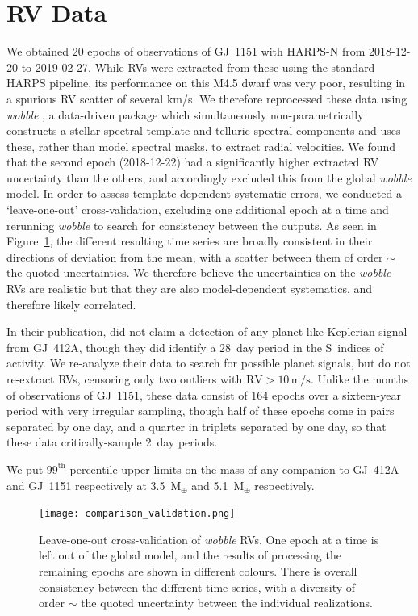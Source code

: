 \documentclass[modern]{aastex62}
\newcommand{\mearth}{\mbox{$\mathrm{M}_{\oplus}$}\xspace}
\begin{document}
\section{RV Data}
\label{sec:k2}

We obtained 20 epochs of observations of GJ~1151 with HARPS-N from 2018-12-20 to 2019-02-27. While RVs were extracted from these using the standard HARPS pipeline, its performance on this M4.5 dwarf was very poor, resulting in a spurious RV scatter of several km/s. We therefore reprocessed these data using \textit{wobble} \citep{wobble}, a data-driven package which simultaneously non-parametrically constructs a stellar spectral template and telluric spectral components and uses these, rather than model spectral masks, to extract radial velocities. We found that the second epoch (2018-12-22) had a significantly higher extracted RV uncertainty than the others, and accordingly excluded this from the global \textit{wobble} model. In order to assess template-dependent systematic errors, we conducted a `leave-one-out' cross-validation, excluding one additional epoch at a time and rerunning \textit{wobble} to search for consistency between the outputs. As seen in Figure~\ref{xvalidation}, the different resulting time series are broadly consistent in their directions of deviation from the mean, with a scatter between them of order $\sim$ the quoted uncertainties. We therefore believe the uncertainties on the \textit{wobble} RVs are realistic but that they are also model-dependent systematics, and therefore likely correlated. 

In their publication, \citet{hires} did not claim a detection of any planet-like Keplerian signal from GJ~412A, though they did identify a 28~day period in the S~indices of activity. We re-analyze their data to search for possible planet signals, but do not re-extract RVs, censoring only two outliers with $\text{RV}>10\,\text{m/s}$. Unlike the months of observations of GJ~1151, these data consist of 164 epochs over a sixteen-year period with very irregular sampling, though half of these epochs come in pairs separated by one day, and a quarter in triplets separated by one day, so that these data critically-sample 2~day periods.

We put $99^{\text{th}}$-percentile upper limits on the mass of any companion to GJ~412A and GJ~1151 respectively at 3.5~\mearth and 5.1~\mearth respectively. 

\begin{figure}
\noindent\texttt{[image: comparison\_validation.png]}

\caption{\label{xvalidation}
Leave-one-out cross-validation of \textit{wobble} RVs. One epoch at a time is left out of the global model, and the results of processing the remaining epochs are shown in different colours. There is overall consistency between the different time series, with a diversity of order $\sim$ the quoted uncertainty between the individual realizations. %
}
\end{figure}
\end{document}
